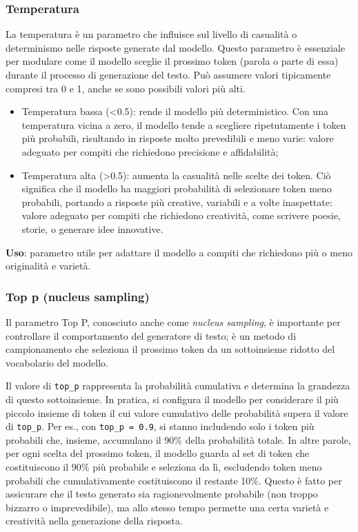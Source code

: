         \subsubsection{Temperatura}
            La temperatura è un parametro che influisce sul livello di casualità o determinismo nelle risposte generate dal modello. Questo parametro è essenziale per modulare come il modello sceglie il prossimo token (parola o parte di essa) durante il processo di generazione del testo. Può assumere valori tipicamente compresi tra 0 e 1, anche se sono possibili valori più alti.
            \begin{itemize}
                \item Temperatura bassa (<0.5): rende il modello più deterministico. Con una temperatura vicina a zero, il modello tende a scegliere ripetutamente i token più probabili, risultando in risposte molto prevedibili e meno varie: valore adeguato per compiti che richiedono precisione e affidabilità;
                
                \item Temperatura alta (>0.5): aumenta la casualità nelle scelte dei token. Ciò significa che il modello ha maggiori probabilità di selezionare token meno probabili, portando a risposte più creative, variabili e a volte inaspettate: valore adeguato per compiti che richiedono creatività, come scrivere poesie, storie, o generare idee innovative.
            \end{itemize}

            \textbf{Uso}: parametro utile per adattare il modello a compiti che richiedono più o meno originalità e varietà.
            
        \subsubsection{Top p (nucleus sampling)}
            Il parametro Top P, conosciuto anche come \textit{nucleus sampling}, è importante per controllare il comportamento del generatore di testo; è un metodo di campionamento che seleziona il prossimo token da un sottoinsieme ridotto del vocabolario del modello.

            Il valore di \texttt{top\_p} rappresenta la probabilità cumulativa e determina la grandezza di questo sottoinsieme. In pratica, si configura il modello per considerare il più piccolo insieme di token il cui valore cumulativo delle probabilità supera il valore di \texttt{top\_p}. Per es., con \texttt{top\_p = 0.9}, si stanno includendo solo i token più probabili che, insieme, accumulano il 90\% della probabilità totale. In altre parole, per ogni scelta del prossimo token, il modello guarda al set di token che costituiscono il 90\% più probabile e seleziona da lì, escludendo token meno probabili che cumulativamente costituiscono il restante 10\%. Questo è fatto per assicurare che il testo generato sia ragionevolmente probabile (non troppo bizzarro o imprevedibile), ma allo stesso tempo permette una certa varietà e creatività nella generazione della risposta.

